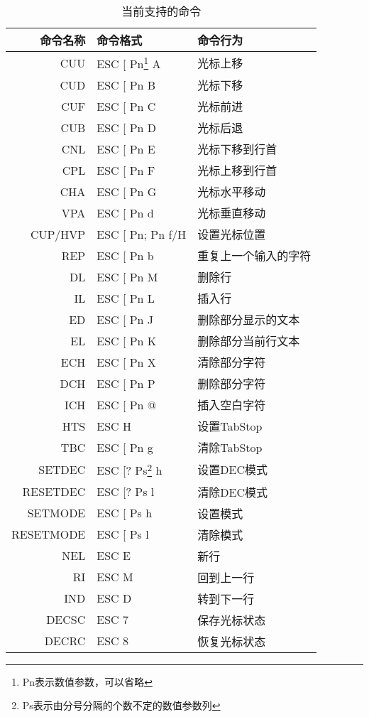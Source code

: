 \begin{longtable}{|r|l|l|}
	\caption{当前支持的命令}
\label{tab:supported-commands} \\

\hline
\textbf{命令名称} & \textbf{命令格式} & \textbf{命令行为} \\ \hline
CUU & ESC [ Pn\footnote{Pn表示数值参数，可以省略} A & 光标上移\\ \hline
CUD & ESC [ Pn B & 光标下移\\ \hline
CUF & ESC [ Pn C & 光标前进\\ \hline
CUB & ESC [ Pn D & 光标后退\\ \hline
CNL & ESC [ Pn E & 光标下移到行首\\ \hline
CPL & ESC [ Pn F & 光标上移到行首\\ \hline
CHA & ESC [ Pn G & 光标水平移动\\ \hline
VPA & ESC [ Pn d & 光标垂直移动\\ \hline
CUP/HVP & ESC [ Pn; Pn f/H & 设置光标位置\\ \hline \hline

REP & ESC [ Pn b & 重复上一个输入的字符 \\ \hline
DL & ESC [ Pn M &删除行 \\ \hline
IL & ESC [ Pn L &插入行 \\ \hline
ED &ESC [ Pn J &删除部分显示的文本 \\ \hline
EL &ESC [ Pn K &删除部分当前行文本 \\ \hline
ECH & ESC [ Pn X &清除部分字符 \\ \hline
DCH & ESC [ Pn P &删除部分字符 \\ \hline
ICH & ESC [ Pn @ &插入空白字符 \\ \hline \hline

HTS & ESC H & 设置TabStop \\ \hline
TBC & ESC [ Pn g & 清除TabStop \\ \hline \hline

SETDEC & ESC [? Ps\footnote{Ps表示由分号分隔的个数不定的数值参数列} h & 设置DEC模式 \\ \hline
RESETDEC & ESC [? Ps l & 清除DEC模式 \\ \hline
SETMODE &ESC [ Ps h & 设置模式 \\ \hline
RESETMODE & ESC [ Ps l &清除模式 \\ \hline \hline

NEL & ESC E &新行 \\ \hline
RI & ESC M & 回到上一行 \\ \hline
IND & ESC D &转到下一行 \\ \hline
DECSC & ESC 7& 保存光标状态 \\ \hline
DECRC &ESC 8& 恢复光标状态 \\ \hline \hline


\end{longtable}
